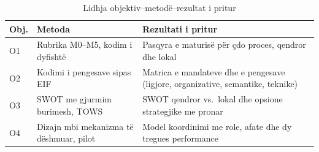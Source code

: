 \documentclass[conference]{IEEEtran}
\begin{document}
\begin{table}[!t]
\caption{Lidhja objektiv--metodë--rezultat i pritur}
\label{tab:objmet}
\centering
\footnotesize
\renewcommand{\arraystretch}{1.15}
\begin{tabular}{L{0.08\columnwidth} L{0.36\columnwidth} L{0.44\columnwidth}}
\toprule
\textbf{Obj.} & \textbf{Metoda} & \textbf{Rezultati i pritur} \\
\midrule
O1 & Rubrika M0--M5, kodim i dyfishtë & Pasqyra e maturisë për çdo proces,
qendror dhe lokal \\
O2 & Kodimi i pengesave sipas EIF & Matrica e mandateve dhe e pengesave
(ligjore, organizative, semantike, teknike) \\
O3 & SWOT me gjurmim burimesh, TOWS & SWOT qendror vs.\ lokal dhe opsione
strategjike me pronar \\
O4 & Dizajn mbi mekanizma të dëshmuar, pilot & Model koordinimi me role,
afate dhe dy tregues performance \\
\bottomrule
\end{tabular}
\end{table}
\end{document}
